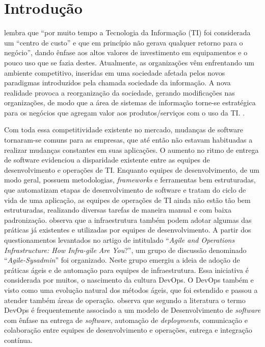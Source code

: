 \documentclass[twoside,english,brazilian]{UNISINOSartigo}
\begin{document}
\section{Introdução}

 lembra que ``por muito tempo a Tecnologia da Informação (TI) foi considerada um ``centro de custo'' e que em princípio não gerava qualquer retorno para o negócio'', dando ênfase aos altos valores de investimento em equipamentos e o pouco uso que se fazia destes.  Atualmente, as organizações vêm enfrentando um ambiente competitivo, inseridas em uma sociedade afetada pelos novos paradigmas introduzidos pela chamada sociedade da informação. A nova realidade provoca a reorganização da sociedade, gerando modificações nas organizações, de modo que a área de sistemas de informação torne-se estratégica para os negócios que agregam valor aos produtos/serviços com o uso da TI.  \cite[p. 15]{AudyFreitag08}.

Com toda essa competitividade existente no mercado, mudanças de software tornaram-se comuns para as empresas, que até então não estavam habituadas a realizar mudanças constantes em suas aplicações. O aumento no ritmo de entrega de software evidenciou a disparidade existente entre as equipes de desenvolvimento e operações de TI. Enquanto equipes de desenvolvimento, de um modo geral, possuem metodologias, \textit{frameworks} e ferramentas bem estruturadas, que automatizam etapas de desenvolvimento de software e tratam do ciclo de vida de uma aplicação, as equipes de operações de TI ainda  não estão tão bem estruturadas, realizando diversas tarefas de maneira manual e com baixa padronização. 
 observa que a infraestrutura também podem adotar algumas das práticas já existentes e utilizadas por equipes de desenvolvimento. A partir dos questionamentos levantados no artigo de  intitulado ``\textit{Agile and Operations Infrastructure: How Infra-gile Are You}?'', um grupo de discussão denominado ``\textit{Agile-Sysadmin}'' foi organizado. Neste grupo emergiu a ideia de adoção de práticas ágeis e de automação para equipes de infraestrutura. Essa iniciativa é considerada por muitos, o nascimento da cultura DevOps. O DevOps também e visto como uma evolução natural dos métodos ágeis, que foi estendido e passou a atender também áreas de operação.  observa que segundo a literatura o termo DevOps é frequentemente associado a um modelo de Desenvolvimento de \textit{software} com ênfase na entrega de \textit{software}, automação de \textit{deployments}, comunicação e colaboração entre equipes de desenvolvimento e operações, entrega e integração contínua. 
\end{document}
